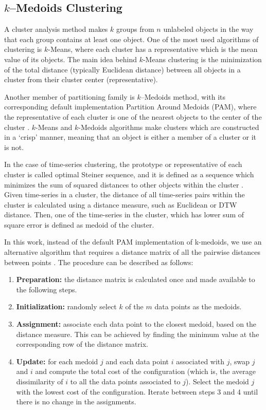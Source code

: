 
\subsection{$k$--Medoids Clustering }
\label{Sec:kMedoidsClustering}

A cluster analysis method makes $k$ groups from $n$ unlabeled objects in the way that each group contains at least one object. One of the most used algorithms of clustering is $k$-Means, where each cluster has a representative which is the mean value of its objects. The main idea behind $k$-Means clustering is the minimization of the total distance (typically Euclidean distance) between all objects in a cluster from their cluster center (representative).

Another member of partitioning family is $k$--Medoids method, with its corresponding default implementation Partition Around Medoids (PAM), where the representative of each cluster is one of the nearest objects to the center of the cluster \cite{Kaufman2009}. $k$-Means and $k$-Medoids algorithms make clusters which are constructed in a `crisp' manner, meaning that an object is either a member of a cluster or it is not.

In the case of time-series clustering, the prototype or representative of each cluster is called optimal Steiner sequence, and it is defined as a sequence which minimizes the sum of squared distances to other objects within the cluster \cite{Kaufman2009}. Given time-series in a cluster, the distance of all time-series pairs within the cluster is calculated using a distance measure, such as Euclidean or DTW distance. Then, one of the time-series in the cluster, which has lower sum of square error is defined as medoid of the cluster.

In this work, instead of the default PAM implementation of k-medoids, we use an alternative algorithm that requires a distance matrix of all the pairwise distances between points \cite{Park2009}. The procedure can be described as follows:

\begin{enumerate}
    \item \textbf{Preparation:} the distance matrix is calculated once and made available to the following steps.
    \item \textbf{Initialization:} randomly select $k$ of the $m$ data points as the medoids.
    \item \textbf{Assignment:} associate each data point to the closest medoid, based on the distance measure. This can be achieved by finding the minimum value at the corresponding row of the distance matrix.
    \item \textbf{Update:} for each medoid $j$ and each data point $i$ associated with $j$, swap $j$ and $i$ and compute the total cost of the configuration (which is, the average dissimilarity of $i$ to all the data points associated to $j$). 
    Select the medoid $j$ with the lowest cost of the configuration. Iterate between steps 3 and 4 until there is no change in the assignments.
\end{enumerate}


